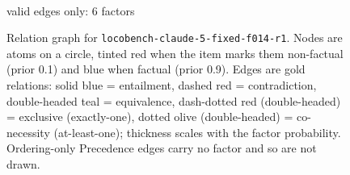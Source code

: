 \documentclass[11pt]{article}
\begin{document}
\begin{figure}[htbp]
\begin{minipage}[t]{0.48\linewidth}
{
}
\\[2pt]{\footnotesize valid edges only: 6 factors}
\end{minipage}
\caption{Relation graph for \texttt{locobench-claude-5-fixed-f014-r1}. Nodes are atoms on a circle, tinted red when the item marks them non-factual (prior 0.1) and blue when factual (prior 0.9). Edges are gold relations: solid blue = entailment, dashed red = contradiction, double-headed teal = equivalence, dash-dotted red (double-headed) = exclusive (exactly-one), dotted olive (double-headed) = co-necessity (at-least-one); thickness scales with the factor probability. Ordering-only Precedence edges carry no factor and so are not drawn.}
\label{fig:graph-locobench-claude-5-fixed-f014-r1}
\end{figure}
\end{document}
